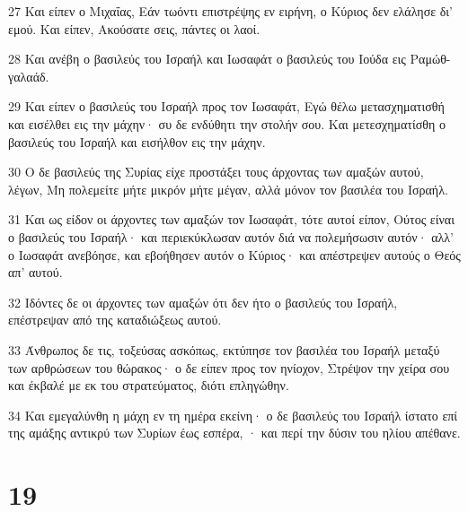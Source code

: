 \par 27 Και είπεν ο Μιχαΐας, Εάν τωόντι επιστρέψης εν ειρήνη, ο Κύριος δεν ελάλησε δι' εμού. Και είπεν, Ακούσατε σεις, πάντες οι λαοί.
\par 28 Και ανέβη ο βασιλεύς του Ισραήλ και Ιωσαφάτ ο βασιλεύς του Ιούδα εις Ραμώθ-γαλαάδ.
\par 29 Και είπεν ο βασιλεύς του Ισραήλ προς τον Ιωσαφάτ, Εγώ θέλω μετασχηματισθή και εισέλθει εις την μάχην· συ δε ενδύθητι την στολήν σου. Και μετεσχηματίσθη ο βασιλεύς του Ισραήλ και εισήλθον εις την μάχην.
\par 30 Ο δε βασιλεύς της Συρίας είχε προστάξει τους άρχοντας των αμαξών αυτού, λέγων, Μη πολεμείτε μήτε μικρόν μήτε μέγαν, αλλά μόνον τον βασιλέα του Ισραήλ.
\par 31 Και ως είδον οι άρχοντες των αμαξών τον Ιωσαφάτ, τότε αυτοί είπον, Ούτος είναι ο βασιλεύς του Ισραήλ· και περιεκύκλωσαν αυτόν διά να πολεμήσωσιν αυτόν· αλλ' ο Ιωσαφάτ ανεβόησε, και εβοήθησεν αυτόν ο Κύριος· και απέστρεψεν αυτούς ο Θεός απ' αυτού.
\par 32 Ιδόντες δε οι άρχοντες των αμαξών ότι δεν ήτο ο βασιλεύς του Ισραήλ, επέστρεψαν από της καταδιώξεως αυτού.
\par 33 Άνθρωπος δε τις, τοξεύσας ασκόπως, εκτύπησε τον βασιλέα του Ισραήλ μεταξύ των αρθρώσεων του θώρακος· ο δε είπεν προς τον ηνίοχον, Στρέψον την χείρα σου και έκβαλέ με εκ του στρατεύματος, διότι επληγώθην.
\par 34 Και εμεγαλύνθη η μάχη εν τη ημέρα εκείνη· ο δε βασιλεύς του Ισραήλ ίστατο επί της αμάξης αντικρύ των Συρίων έως εσπέρα, · και περί την δύσιν του ηλίου απέθανε.

\chapter{19}

